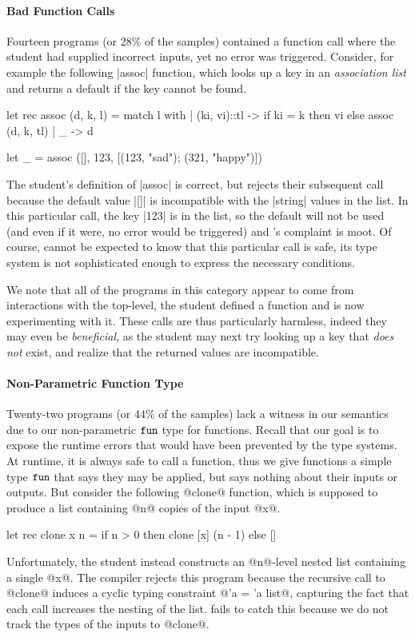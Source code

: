 \paragraph{Bad Function Calls}
Fourteen programs (or 28\% of the samples) contained a function call
where the student had supplied incorrect inputs, yet no error was
triggered.
%
Consider, for example the following |assoc| function, which
looks up a key in an \emph{association list} and returns a default if
the key cannot be found.
%
\begin{code}
  let rec assoc (d, k, l) = match l with
    | (ki, vi)::tl ->
       if ki = k then
         vi
       else
         assoc (d, k, tl)
    | _ -> d

  let _ = assoc ([], 123, [(123, "sad"); (321, "happy")])
\end{code}
%
The student's definition of |assoc| is correct, but \ocaml rejects their
subsequent call because the default value |[]| is incompatible with the
|string| values in the list.
%
In this particular call, the key |123| is in the list, so the default
will not be used (and even if it were, no error would be triggered) and
\ocaml's complaint is moot.
%
Of course, \ocaml cannot be expected to know that this particular call
is safe, its type system is not sophisticated enough to express the
necessary conditions.

We note that all of the programs in this category appear to come from
interactions with the \ocaml top-level, \ie the student defined a
function and is now experimenting with it.
%
These calls are thus particularly harmless, indeed they may even be
\emph{beneficial}, as the student may next try looking up a key that
\emph{does not} exist, and realize that the returned values are
incompatible.


\paragraph{Non-Parametric Function Type}
%
Twenty-two programs (or 44\% of the samples) lack a witness in our
semantics due to our non-parametric $\mathtt{fun}$ type for functions.
%
Recall that our goal is to expose the runtime errors that would have
been prevented by the type systems.
%
At runtime, it is always safe to call a function, thus we give functions
a simple type $\mathtt{fun}$ that says they may be applied, but says nothing
about their inputs or outputs.
%
But consider the following @clone@ function, which is supposed to
produce a list containing @n@ copies of the input @x@.
%
%
\begin{code}
  let rec clone x n =
    if n > 0 then
      clone [x] (n - 1)
    else
      []
\end{code}
%
Unfortunately, the student instead constructs an @n@-level nested list
containing a single @x@.
%
The \ocaml compiler rejects this program because the recursive call to
@clone@ induces a cyclic typing constraint @'a = 'a list@, capturing the
fact that each call increases the nesting of the list.
%
\toolname fails to catch this because we do not track the types of the
inputs to @clone@.

